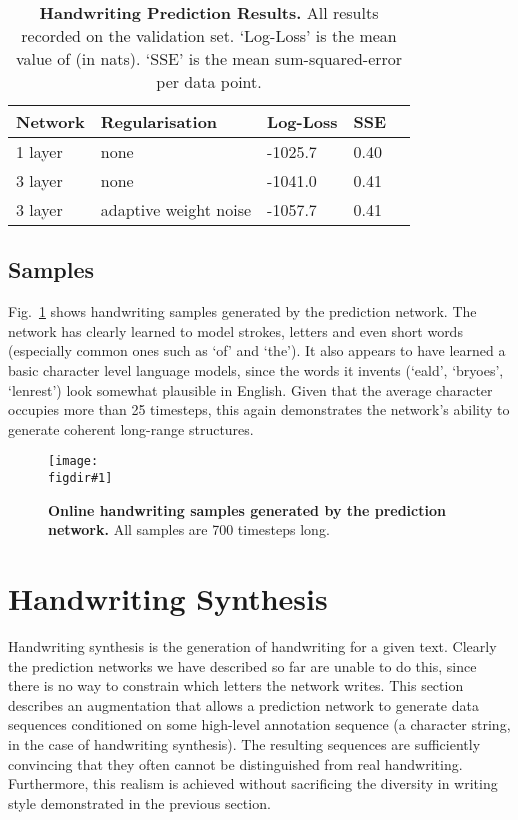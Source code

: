 \documentclass{article}
\newcommand{\flabel}[1]{\label{fig:#1}}
\newcommand{\seclabel}[1]{\label{sec:#1}}
\newcommand{\tlabel}[1]{\label{tab:#1}}
\newcommand{\fref}[1]{Fig.~\ref{fig:#1}}
\newcommand{\figdir}{}
\newcommand{\capt}[2]{\caption[#1]{\textbf{#1}#2}}
\newcommand{\fig}[5]
{
\begin{figure}
\begin{center}
\texttt{[image: \\figdir\#1]}
\end{center}
\capt{#4}{#5}
\flabel{#2}
\end{figure}
}
\begin{document}
\begin{table}
\centering
\capt{Handwriting Prediction Results.}{ All results recorded on the validation set. `Log-Loss' is the mean value of  (in nats). `SSE' is the mean sum-squared-error per data point.}
\tlabel{hand_pred}
\vskip 0.15in
\begin{center}
\begin{sc}
\begin{tabular}{lllll}
\hline
Network & Regularisation &Log-Loss & SSE\\
\hline
1 layer & none & -1025.7& 0.40\\
3 layer & none & -1041.0  & 0.41\\
3 layer & adaptive weight noise & -1057.7  & 0.41\\
\hline
\end{tabular}
\end{sc}
\end{center}
\vskip -0.1in
\end{table}

\subsection{Samples}

\fref{pred_handwriting} shows handwriting samples generated by the prediction network.
The network has clearly learned to model strokes, letters and even short words (especially common ones such as `of' and `the').
It also appears to have learned a basic character level language models, since the words it invents (`eald', `bryoes', `lenrest') look somewhat plausible in English.
Given that the average character occupies more than 25 timesteps, this again demonstrates the network's ability to generate coherent long-range structures.

\fig{pred}{pred_handwriting}{1}{Online handwriting samples generated by the prediction network.}{ All samples are 700 timesteps long.
}

\section{Handwriting Synthesis}
\seclabel{hand_synth}
Handwriting synthesis is the generation of handwriting for a given text.
Clearly the prediction networks we have described so far are unable to do this, since there is no way to constrain which letters the network writes.
This section describes an augmentation that allows a prediction network to generate data sequences conditioned on some high-level annotation sequence (a character string, in the case of handwriting synthesis).
The resulting sequences are sufficiently convincing that they often cannot be distinguished from real handwriting.
Furthermore, this realism is achieved without sacrificing the diversity in writing style demonstrated in the previous section.
\end{document}
